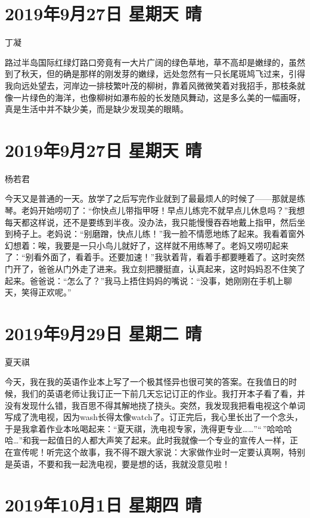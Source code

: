 \section{2019年9月27日 星期天 晴}

丁凝

路过半岛国际红绿灯路口旁竟有一大片广阔的绿色草地，草不高却是嫩绿的，虽然到了秋天，但的确是那样的刚发芽的嫩绿，远处忽然有一只长尾斑鸠飞过来，引得我向远处望去，河岸边一排枝繁叶茂的柳树，靠着风微微笑着对我招手，那枝条就像一片绿色的海洋，也像柳树如瀑布般的长发随风舞动，这是多么美的一幅画呀，真是生活中并不缺少美，而是缺少发现美的眼睛。

\section{2019年9月27日 星期天 晴}

杨若君

今天又是普通的一天。放学了之后写完作业就到了最最烦人的时候了------那就是练琴。老妈开始唠叨了：``你快点儿带指甲呀！早点儿练完不就早点儿休息吗？''我想每天都这样说，还不是要练到半夜。没办法，我只能慢慢吞吞地戴上指甲，然后坐到椅子上。老妈说：``别磨蹭，快点儿练！''我一脸不情愿地练了起来。我看着窗外幻想着：唉，我要是一只小鸟儿就好了，这样就不用练琴了。老妈又唠叨起来了：``别看外面了，看着手。还要加速！''我驮着背，看着手都要睡着了。这时突然门开了，爸爸从门外走了进来。我立刻把腰挺直，认真起来，这时妈妈忍不住笑了起来。爸爸说：``怎么了？''我马上捂住妈妈的嘴说：``没事，她刚刚在手机上聊天，笑得正欢呢。''

\section{2019年9月29日 星期二 晴}

夏天祺

今天，我在我的英语作业本上写了一个极其怪异也很可笑的答案。在我值日的时候，我们的英语老师让我订正一下前几天忘记订正的作业。我打开本子看了看，并没有发现什么错，我百思不得其解地挠了挠头。突然，我发现我把看电视这个单词写成了洗电视，因为wash长得太像watch了。订正完后，我心里长出了一个念头，于是我拿着作业本吆喝起来：``夏天祺，洗电视专家，洗得更专业\ldots\ldots{}''``\,''哈哈哈哈\ldots''和我一起值日的人都大声笑了起来。此时我就像一个专业的宣传人一样，正在宣传呢！听完这个故事，我不得不跟大家说：大家做作业时一定要认真啊，特别是英语，不要和我一起洗电视，要是想的话，我就没意见啦！

\section{2019年10月1日 星期四 晴}

